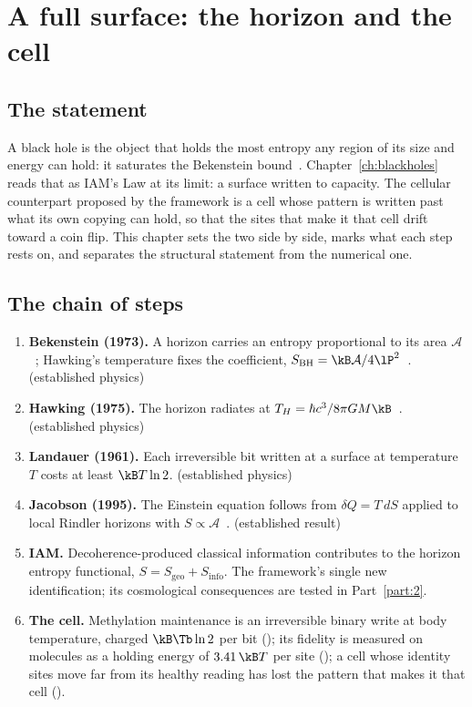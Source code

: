 \chapter{A full surface: the horizon and the cell}\label{ch:floorbreach}

\section{The statement}

A black hole is the object that holds the most entropy any region of its size and energy can hold: it saturates the
Bekenstein bound~\cite{Bekenstein1981}. Chapter~\ref{ch:blackholes} reads that as IAM's Law at its limit: a surface written to
capacity. The cellular counterpart proposed by the framework is a cell whose pattern is written past what its own copying
can hold, so that the sites that make it that cell drift toward a coin flip. This chapter sets the two side by side, marks
what each step rests on, and separates the structural statement from the numerical one.

\section{The chain of steps}

\begin{enumerate}
\item \textbf{Bekenstein (1973).} A horizon carries an entropy proportional to its area $\mathcal A$~\cite{Bekenstein1973};
      Hawking's temperature fixes the coefficient, $S_{\mathrm{BH}}=\kB\mathcal A/4\lP^2$~\cite{Hawking1975}. \derived{} (established physics)
\item \textbf{Hawking (1975).} The horizon radiates at $T_H=\hbar c^3/8\pi GM\kB$~\cite{Hawking1975}. \derived{} (established physics)
\item \textbf{Landauer (1961).} Each irreversible bit written at a surface at temperature $T$ costs at least $\kB T\ln2$.
      \derived{} (established physics)
\item \textbf{Jacobson (1995).} The Einstein equation follows from $\delta Q=T\,dS$ applied to local Rindler horizons with
      $S\propto\mathcal A$~\cite{Jacobson1995}. \derived{} (established result)
\item \textbf{IAM.} Decoherence-produced classical information contributes to the horizon entropy functional,
      $S=S_{\mathrm{geo}}+S_{\mathrm{info}}$. The framework's single new identification; its cosmological consequences are
      tested in Part~\ref{part:2}. \conjecture
\item \textbf{The cell.} Methylation maintenance is an irreversible binary write at body temperature, charged $\kB\Tb\ln2$ per
      bit (\derived); its fidelity is measured on molecules as a holding energy of $3.41\,\kB T$ per site (\measured); a cell
      whose identity sites move far from its healthy reading has lost the pattern that makes it that cell (\conjecture).
\end{enumerate}

